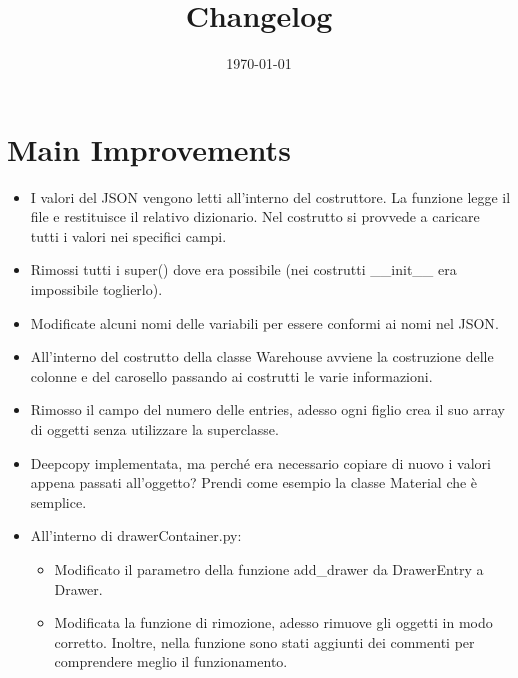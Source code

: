 \documentclass[a4paper]{article}
\begin{document}
	\title{Changelog}
	\date{\today}
	\maketitle
	
	\newpage
	
	\section*{Main Improvements}
	
	\begin{itemize}[label=]
		\item I valori del \textsf{JSON} vengono letti all'interno del costruttore. La funzione legge il file e restituisce il relativo dizionario. Nel costrutto si provvede a caricare tutti i valori nei specifici campi.
		
		\item Rimossi tutti i \textsf{super()} dove era possibile (nei costrutti \textsf{\_\_init\_\_} era impossibile toglierlo).
		
		\item Modificate alcuni nomi delle variabili per essere conformi ai nomi nel \textsf{JSON}.
		
		\item All'interno del costrutto della classe \textsf{Warehouse} avviene la costruzione delle colonne e del carosello passando ai costrutti le varie informazioni.
		
		\item Rimosso il campo del numero delle entries, adesso ogni figlio crea il suo array di oggetti senza utilizzare la superclasse.
		
		\item Deepcopy implementata, ma perché era necessario copiare di nuovo i valori appena passati all'oggetto? Prendi come esempio la classe \textsf{Material} che è semplice.
		
		\item All'interno di \textsf{drawerContainer.py}:
			\begin{itemize}
				\item Modificato il parametro della funzione add\_drawer da \textsf{DrawerEntry} a \textsf{Drawer}.
				
				\item Modificata la funzione di rimozione, adesso rimuove gli oggetti in modo corretto. Inoltre, nella funzione sono stati aggiunti dei commenti per comprendere meglio il funzionamento.
				

\end{itemize}
\end{itemize}
\end{document}

